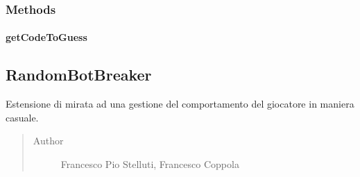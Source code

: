 \documentclass[letterpaper,10pt,italian,openany,oneside]{sphinxmanual}
\begin{document}
\subsubsection{Methods}
\label{\detokenize{source/it/unicam/cs/pa/mastermind/players/InteractiveMaker:methods}}

\paragraph{getCodeToGuess}
\label{\detokenize{source/it/unicam/cs/pa/mastermind/players/InteractiveMaker:getcodetoguess}}

\begin{fulllineitems}
\label{\detokenize{source/it/unicam/cs/pa/mastermind/players/InteractiveMaker:it.unicam.cs.pa.mastermind.players.InteractiveMaker.getCodeToGuess()}}
\end{fulllineitems}



\subsection{RandomBotBreaker}
\label{\detokenize{source/it/unicam/cs/pa/mastermind/players/RandomBotBreaker:randombotbreaker}}\label{\detokenize{source/it/unicam/cs/pa/mastermind/players/RandomBotBreaker::doc}}

\begin{fulllineitems}
\label{\detokenize{source/it/unicam/cs/pa/mastermind/players/RandomBotBreaker:it.unicam.cs.pa.mastermind.players.RandomBotBreaker}}
Estensione di  mirata ad una gestione del comportamento del giocatore in maniera casuale.
\begin{quote}\begin{description}
\item[{Author}] \leavevmode
Francesco Pio Stelluti, Francesco Coppola

\end{description}\end{quote}

\end{fulllineitems}
\end{document}
